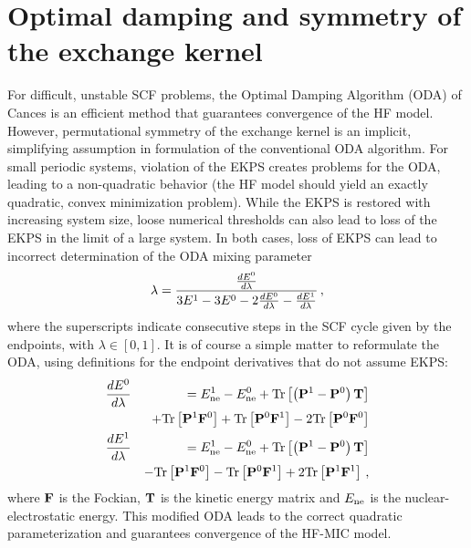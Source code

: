 \documentclass[prb,aps,nobibnotes,twocolumn,doublespace,twocolumngrid,superbib,showpacs]{revtex4}
\begin{document}
\section{Optimal damping and symmetry of the exchange kernel}

For difficult, unstable SCF problems, the Optimal Damping Algorithm (ODA) of Cances \cite{ECances00} is
an efficient method that guarantees convergence of the HF model.  
However,  permutational symmetry of the exchange kernel is an implicit, simplifying assumption in formulation
of the conventional ODA algorithm.   For small periodic systems, violation of the EKPS creates problems
for the ODA, leading to a non-quadratic behavior (the HF model should yield an exactly quadratic, convex 
minimization problem).   While the EKPS is restored with increasing system size, loose numerical thresholds
can also lead to loss of the EKPS in the limit of a large system.  
In both cases, loss of EKPS can lead to incorrect determination of the ODA mixing parameter
%
\begin{eqnarray}
\lambda = {{\frac{d E^0}{d \lambda}} \over {3E^1-3E^0-2{\frac{d E^0}{d \lambda}}-{\frac{d E^1}{d \lambda}}}} \, ,
\end{eqnarray}
%
where the superscripts indicate consecutive steps in the SCF cycle given by the endpoints, 
with $\lambda \in [0,1]$.   It is of course a simple matter to reformulate the ODA, using definitions 
for the endpoint derivatives that do not assume EKPS:
\begin{eqnarray}
\frac{d E^0}{d \lambda} &&=  E^{1}_{\rm ne}-E^{0}_{\rm ne}  
+{\rm Tr}\left[\left( {\bf P}^1 - {\bf P}^0 \right) {\bf T}  \right]\nonumber\\
&& +{\rm Tr}\left[ {\bf P}^1 {\bf F}^0 \right] 
   +{\rm Tr}\left[ {\bf P}^0 {\bf F}^1 \right] 
   -2 {\rm Tr}\left[ {\bf P}^0 {\bf F}^0 \right] \nonumber\\
\frac{d E^1}{d \lambda} &&=  E^{1}_{\rm ne}-E^{0}_{\rm ne}  
+{\rm Tr}\left[\left( {\bf P}^1 - {\bf P}^0 \right) {\bf T}  \right]\nonumber\\
&& -{\rm Tr}\left[ {\bf P}^1 {\bf F}^0 \right] 
   -{\rm Tr}\left[ {\bf P}^0 {\bf F}^1 \right] 
   +2 {\rm Tr}\left[ {\bf P}^1 {\bf F}^1 \right] \, , \nonumber\\
\end{eqnarray}
where  ${\bf F}$ is the Fockian, $\bf T$ is the kinetic energy matrix  and $E_{\rm ne}$ is the nuclear-electrostatic energy.
This  modified ODA leads to the correct quadratic parameterization and guarantees convergence of the HF-MIC model.  
\end{document}
